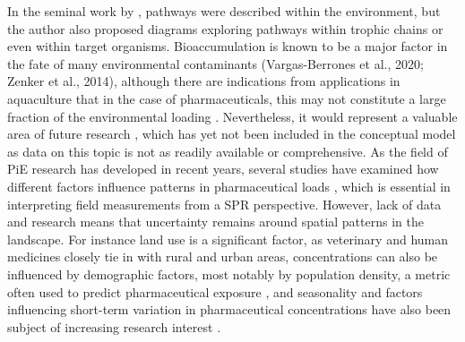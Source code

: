 \documentclass{article}
\begin{document}
In the  seminal work by \citet{Holdgate1979APollution.}, pathways were described within the environment, but the author also proposed diagrams exploring pathways within trophic chains or even within target organisms. Bioaccumulation is known to be a major factor in the fate of many environmental contaminants (Vargas-Berrones et al., 2020; Zenker et al., 2014), although there are indications from applications in aquaculture that in the case of pharmaceuticals, this may not constitute a large fraction of the environmental loading \citep{Rico2013ProbabilisticAsia}. Nevertheless, it would represent a valuable area of future research  \citep{Stuart2012ReviewGroundwater}, which has yet not been included in the conceptual model as data on this topic is not as readily available or comprehensive. As the field of PiE research has developed in recent years, several studies have examined how different factors influence patterns in pharmaceutical loads \citep{Burns2018TemporalSystem,Vatovec2016InvestigatingSetting}, which is essential in interpreting field measurements from a SPR perspective. However, lack of data and research means that uncertainty remains around spatial patterns in the landscape. For instance land use is a significant factor, as veterinary and human medicines closely tie in with rural and urban areas, concentrations can also be influenced by demographic factors, most notably by population density, a metric often used to predict pharmaceutical exposure \citep{Brodin2014EcologicalAlterations}, and seasonality and factors influencing short-term variation in pharmaceutical concentrations have also been subject of increasing research interest \citep{Burns2018ApplicationPharmaceuticals}.
\end{document}

